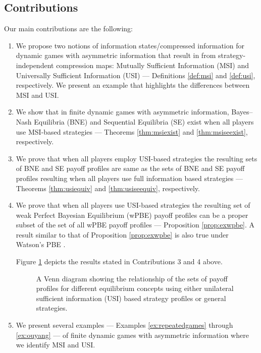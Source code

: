 \documentclass[pdflatex,sn-basic]{sn-jnl}
\theoremstyle{thmstyleone}%
\theoremstyle{thmstyletwo}%
\theoremstyle{thmstylethree}%
\begin{document}
\subsection{Contributions}\label{sec:contributions}
Our main contributions are the following:
\begin{enumerate}
    \item We propose two notions of information states/compressed information for dynamic games with asymmetric information that result in from strategy-independent compression maps: Mutually Sufficient Information (MSI) and Universally Sufficient Information (USI) --- Definitions \ref{def:msi} and \ref{def:usi}, respectively. We present an example that highlights the differences between MSI and USI.
    \item We show that in finite dynamic games with asymmetric information, Bayes--Nash Equilibria (BNE) and Sequential Equilibria (SE) exist when all players use MSI-based strategies --- Theorems \ref{thm:msiexist} and \ref{thm:msiseexist}, respectively.
    \item We prove that when all players employ USI-based strategies the resulting sets of BNE and SE payoff profiles are same as the sets of BNE and SE payoff profiles resulting when all players use full information based strategies --- Theorems \ref{thm:usiequiv} and \ref{thm:usiseequiv}, respectively.
    \item We prove that when all players use USI-based strategies the resulting set of weak Perfect Bayesian Equilibrium (wPBE) payoff profiles can be a proper subset of the set of all wPBE payoff profiles --- Proposition \ref{prop:exwpbe}. A result similar to that of Proposition \ref{prop:exwpbe} is also true under Watson's PBE \citep{watson2017general}. 

    Figure \ref{fig:vennpayoff} depicts the results stated in Contributions 3 and 4 above.

    \begin{figure}[!ht]
    	\centering
    	\caption{A Venn diagram showing the relationship of the sets of payoff profiles for different equilibrium concepts using either unilateral sufficient information (USI) based strategy profiles or general strategies.} \label{fig:vennpayoff}
    \end{figure}
    
    \item We present several examples --- Examples \ref{ex:repeatedgames} through \ref{ex:ouyang} --- of finite dynamic games with asymmetric information where we identify MSI and USI.\\
\end{enumerate}
\end{document}
